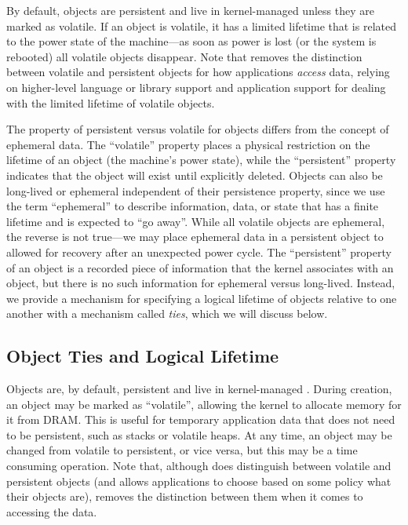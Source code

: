 By default, objects are persistent and live in kernel-managed \NVM unless they are marked as
volatile. If an object is volatile, it has a limited lifetime that is related to the power state of
the machine---as soon as power is lost (or the system is rebooted) all volatile objects disappear.
Note that \Twizzler removes the distinction between volatile and persistent objects for how
applications \emph{access} data, relying on higher-level language or library support and application
support for dealing with the limited lifetime of volatile objects.

The property of persistent versus volatile for objects differs from the concept of
ephemeral data. The ``volatile'' property places a physical restriction on the lifetime of an object (the machine's
power state), while the ``persistent'' property indicates that the object will exist until
explicitly deleted. Objects can also be long-lived or ephemeral independent of their persistence
property, since we use the term ``ephemeral'' to describe information, data, or state that has a
finite lifetime and is expected to ``go away''. While all volatile objects are ephemeral, the
reverse is not true---we may place ephemeral data in a persistent object to allowed for recovery
after an unexpected power cycle. The ``persistent'' property of an object is a recorded piece
of information that the kernel associates with an object, but there is no such information for ephemeral
versus long-lived. Instead, we provide a mechanism for specifying a logical lifetime of objects
relative to one another with a mechanism called \emph{ties}, which we will discuss below.

\subsection{Object Ties and Logical Lifetime}

\iffalse
    Objects are, by default, persistent and live in kernel-managed \NVM. During creation, an object may
    be marked as ``volatile'', allowing the kernel to allocate memory for it from DRAM. This is useful
    for temporary application data that does not need to be persistent, such as stacks or volatile
    heaps. At any time, an object may be changed from volatile to persistent, or vice versa, but this
    may be a time consuming operation. Note that, although \Twizzler does distinguish between volatile
    and persistent objects (and allows applications to choose based on some policy what their objects
    are), \Twizzler removes the distinction between them when it comes to accessing the data.

